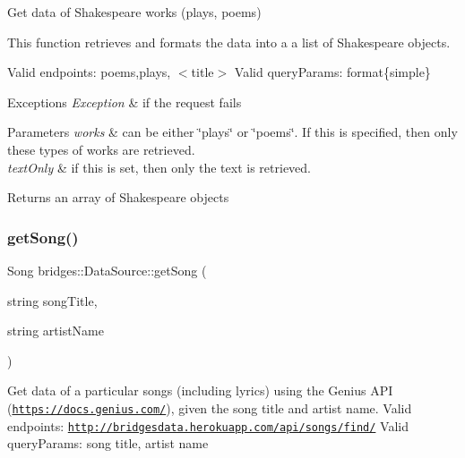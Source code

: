 Get data of Shakespeare works (plays, poems)

This function retrieves and formats the data into a a list of Shakespeare objects.

Valid endpoints\+: \textquotesingle{}poems\textquotesingle{},\textquotesingle{}plays\textquotesingle{}, $<$title$>$ Valid query\+Params\+: format\{simple\}


\begin{DoxyExceptions}{Exceptions}
{\em Exception} & if the request fails\\
\hline
\end{DoxyExceptions}

\begin{DoxyParams}{Parameters}
{\em works} & can be either \char`\"{}plays\char`\"{} or \char`\"{}poems\char`\"{}. If this is specified, then only these types of works are retrieved. \\
\hline
{\em text\+Only} & if this is set, then only the text is retrieved.\\
\hline
\end{DoxyParams}
\begin{DoxyReturn}{Returns}
an array of Shakespeare objects 
\end{DoxyReturn}
\mbox{\label{namespacebridges_1_1_data_source_a284c9d572415b67df6989ab8ab97d0e2}} 
\subsubsection{\texorpdfstring{get\+Song()}{getSong()}}
{\footnotesize\ttfamily Song bridges\+::\+Data\+Source\+::get\+Song (\begin{DoxyParamCaption}\item[{string}]{song\+Title,  }\item[{string}]{artist\+Name }\end{DoxyParamCaption})}

Get data of a particular songs (including lyrics) using the Genius A\+PI (\href{https://docs.genius.com/}{\tt https\+://docs.\+genius.\+com/}), given the song title and artist name. Valid endpoints\+: \href{http://bridgesdata.herokuapp.com/api/songs/find/}{\tt http\+://bridgesdata.\+herokuapp.\+com/api/songs/find/} Valid query\+Params\+: song title, artist name

